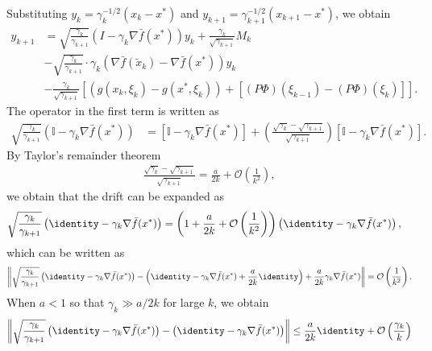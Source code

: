\documentclass[11pt]{article}
\begin{document}
Substituting $y_k = \gamma_k^{-1/2}(x_k - x^*)$ and $y_{k+1} = \gamma_{k+1}^{-1/2}(x_{k+1} - x^*)$, we obtain
\begin{equation}\label{eq:yk_draft1}
\begin{split}
    y_{k+1} &= 
    \sqrt{\frac{\gamma_k}{\gamma_{k+1}}} \left(I - \gamma_k \nabla \bar{f}(x^*)\right)y_k + \frac{\gamma_k}{\sqrt{\gamma_{k+1}}} M_k 
    \\ &
    - \sqrt{\frac{\gamma_k}{\gamma_{k+1}}} \cdot \gamma_k (\nabla \bar{f}(\tilde{x}_k) - \nabla \bar{f}(x^*)) y_k 
    \\ &
    - \frac{\gamma_k}{\sqrt{\gamma_{k+1}}} \left[ \left(g(x_k, \xi_k) - g(x^*, \xi_k)\right) + \left[ (P\Phi)(\xi_{k-1}) - (P\Phi)(\xi_{k})\right] \right] .    
\end{split}    
\end{equation}
The operator in the first term is written as
\begin{align*}
    \sqrt{\frac{\gamma_k}{\gamma_{k+1}}} (\mathbb{I} - \gamma_k \nabla \bar{f}(x^*))
    &= \left[\mathbb{I} - \gamma_k \nabla \bar{f}(x^*) \right]
    + \left(\frac{\sqrt{\gamma_k} - \sqrt{\gamma_{k+1}}}{\sqrt{\gamma_{k+1}}} \right) \left[\mathbb{I}
    -  \gamma_k \nabla \bar{f}(x^*) \right]
    . 
\end{align*}
By Taylor's remainder theorem
\begin{align*}
    \frac{\sqrt{\gamma_k} - \sqrt{\gamma_{k+1}}}{\sqrt{\gamma_{k+1}}} = \frac{a}{2k} 
    + \mathcal{O}\left(\frac{1}{k^2}\right) , 
\end{align*}
we obtain that the drift can be expanded as
\begin{align*}
    \sqrt{\frac{\gamma_k}{\gamma_{k+1}}} 
    \left(\identity - \gamma_k \nabla \bar{f}(x^*)\right)     &=
    \left(1 + \frac{a}{2k} + \mathcal{O}\left(\frac{1}{k^2}\right)  \right) \left(\identity - \gamma_k \nabla \bar{f}(x^*) \right) 
    ,
\end{align*}
which can be written as
\begin{align*}
    \left\lVert \sqrt{\frac{\gamma_k}{\gamma_{k+1}}} 
    \left(\identity - \gamma_k \nabla \bar{f}(x^*)\right)      -
    \left(\identity - \gamma_k \nabla \bar{f}(x^*) + \frac{a}{2k} \identity \right) + \frac{a}{2k}   \gamma_k \nabla \bar{f}(x^*) \right\rVert 
    = \mathcal{O}\left(\frac{1}{k^2} \right) .
\end{align*}
When $a < 1$ so that $\gamma_k \gg a/2k$ for large $k$, we obtain 
\begin{equation}\label{eq:a_le_1}
    \left\lVert \sqrt{\frac{\gamma_k}{\gamma_{k+1}}} \left(\identity - \gamma_k \nabla \bar{f}(x^*)\right) 
    - 
    \left(\identity - \gamma_k \nabla \bar{f}(x^*) \right) 
    \right\rVert 
    \leq \frac{a}{2k} \identity + \mathcal{O}\left(\frac{\gamma_k}{k}\right)    
\end{equation}
\end{document}
